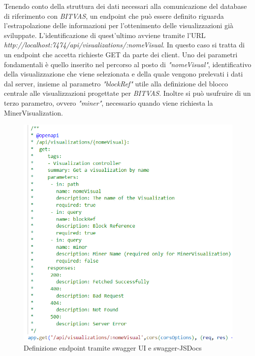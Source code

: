 Tenendo conto della struttura dei dati necessari alla comunicazione del database di riferimento con \textit{BITVAS}, un endpoint che può essere definito riguarda l'estrapolazione delle informazioni per l'ottenimento delle visualizzazioni già sviluppate. L'identificazione di quest'ultimo avviene tramite l'URL \emph{http://localhost:7474/api/visualizations/:nomeVisual}.
 In questo caso si tratta di un endpoint che accetta richieste GET da parte dei client.
Uno dei parametri fondamentali è quello inserito nel percorso al posto di \emph{"nomeVisual"}, identificativo della visualizzazione che viene selezionata e della quale vengono prelevati i dati dal server, insieme al parametro \emph{"blockRef"} utile alla definizione del blocco centrale alle visualizzazioni progettate per \textit{BITVAS}.
Inoltre si può usufruire di un terzo parametro, ovvero \emph{"miner"}, necessario quando viene richiesta la MinerVisualization.

\newpage 
\begin{figure}[H]
    \centering \includegraphics[keepaspectratio=true,scale=0.45]{Images/VisualizationEndpoint.png}
    \caption{Definizione endpoint tramite swagger UI e swagger-JSDocs}
\end{figure}

\thispagestyle{mystyle}

